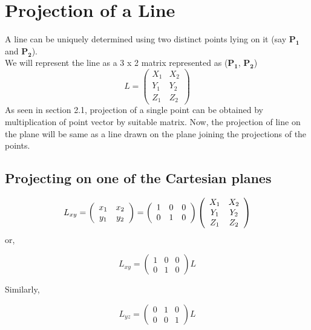 \documentclass[a4paper,11pt,openany]{book}
\begin{document}
\section{Projection of a Line}
A line can be uniquely determined using two distinct points lying on it (say $\boldsymbol{P_{1}}$ and $\boldsymbol{P_{2}}$). 
\\
We will represent the line as a 3 x 2 matrix represented as ($\boldsymbol{P_{1}}$,  $\boldsymbol{P_{2}}$)
\begin{equation}
L = 
\left(\begin{array}{cc} X_1 & X_2 \\ Y_1 & Y_2 \\ Z_1 & Z_2\end{array}\right) 
\end{equation}
As seen in section 2.1, projection of a single point can be obtained by multiplication of point vector by suitable matrix. Now, the projection of line on the plane will be same as a line drawn on the plane joining the projections of the points.
\subsection{Projecting on one of the Cartesian planes}
\begin{equation}
L_{xy} = \left(\begin{array}{c c} x_1 & x_2\\ y_1 & y_2 \end{array}\right) =
\left(\begin{array}{ccc} 1 & 0 & 0 \\ 0 & 1 & 0 \end{array}\right) 
\left(\begin{array}{cc} X_1 & X_2 \\ Y_1 & Y_2 \\ Z_1 & Z_2\end{array}\right)
\end{equation}
or,

\begin{equation}
L_{xy} = 
\left(\begin{array}{ccc} 1 & 0 & 0 \\ 0 & 1 & 0 \end{array}\right)L
\end{equation}

Similarly,

\begin{equation}
L_{yz} = 
\left(\begin{array}{ccc} 0 & 1 & 0 \\ 0 & 0 & 1 \end{array}\right)L
\end{equation}
\end{document}
